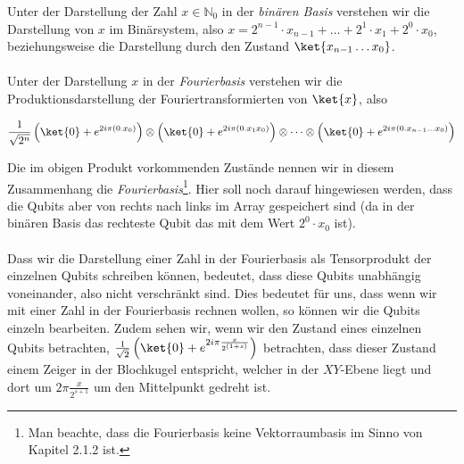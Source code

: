 Unter der Darstellung der Zahl $x \in \mathbb{N}_0$ in der \textit{binären Basis} verstehen wir die Darstellung von $x$ im Binärsystem, also $x = 2^{n - 1}\cdot x_{n - 1} + \dots + 2^1 \cdot x_1 + 2^0 \cdot x_0$, beziehungsweise die Darstellung durch den Zustand $\ket{x_{n - 1}\dots x_0}$.
\paragraph{}
Unter der Darstellung $x$ in der \textit{Fourierbasis} verstehen wir die Produktionsdarstellung der Fouriertransformierten von $\ket{x}$, also 

$$\frac{1}{\sqrt{2^n}}\left(\ket{0} + e^{2i\pi(0.x_0)}\right)\otimes\left(\ket{0} + e^{2i\pi(0.x_1x_0)}\right)\otimes \dots \otimes \left(\ket{0} + e^{2i\pi(0.x_{n - 1}\dots x_0)}\right)$$

Die im obigen Produkt vorkommenden Zustände nennen wir in diesem Zusammenhang die \textit{Fourierbasis}\footnote{Man beachte, dass die Fourierbasis keine Vektorraumbasis im Sinno von Kapitel 2.1.2 ist.}. Hier soll noch darauf hingewiesen werden, dass die Qubits aber von rechts nach links im Array gespeichert sind (da in der binären Basis das rechteste Qubit das mit dem Wert $2^0 \cdot x_0$ ist).

\paragraph{}

Dass wir die Darstellung einer Zahl in der Fourierbasis als Tensorprodukt der einzelnen Qubits schreiben können, bedeutet, dass diese Qubits unabhängig voneinander, also nicht verschränkt sind. Dies bedeutet für uns, dass wenn wir mit einer Zahl in der Fourierbasis rechnen wollen, so können wir die Qubits einzeln bearbeiten. Zudem sehen wir, wenn wir den Zustand eines einzelnen Qubits betrachten, $\frac{1}{\sqrt{2}}\left(\ket{0} + e^{2i\pi\frac{x}{2^{(1 + s)}}}\right)$ betrachten, dass dieser Zustand einem Zeiger in der Blochkugel entspricht, welcher in der $XY$-Ebene liegt und dort um $2\pi\frac{x}{2^{s + 1}}$ um den Mittelpunkt gedreht ist.


